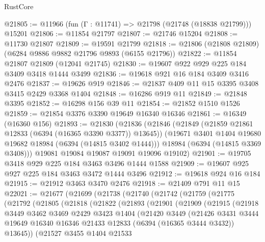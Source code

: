 \begin{lexlean}{RustCore}
\begin{coremodule}
@21805 := @11966 (fun (Γ : @11741) => @21798 (@21748 (@18838 @21799))) @15201
@21806 := @11854 @21797
@21807 := @21746 @15204
@21808 := @11730 @21807
@21809 := @19591 @21799
@21818 := @21806 (@21808 @21809) (@6284 @9886 @9882 @21796 @9893 (@6155 @21796))
@21822 := @11854 @21807 @21809 (@12041 @21745)
@21830 := @19607 @922 @929 @225 @184 @3409 @3418 @1444 @3499
@21836 := @19618 @921 @16 @184 @3409 @3416 @2476
@21837 := @19626 @919
@21846 := @21837 @409 @11 @15 @3395 @3408 @3415 @2429 @3368 @1404
@21848 := @16286 @919 @11
@21849 := @21848 @3395
@21852 := @16298 @156 @39 @11
@21854 := @21852 @1510 @1526
@21859 := @21854 @3376 @3390 @19649 @16340 @16346
@21861 := @16349 (@16360 @156)
@21893 := @21830
    (@21836
      (@21846
        (@21849 (@21859 @21861 @12833 (@6394 (@16365 @3390 @3377)) @13645))
        (@19671 @3401 @1404 @19680 @19682 @18984 (@6394 (@14815 @3402 @1444)))
        @18984
        (@6394 (@14815 @3369 @3408)))
      @19081
      @19084
      @19087
      @19091
      @19096
      @19102)
@21901 := @19705 @3418 @929 @225 @184 @3463 @3496 @1444 @1588
@21909 := @19607 @925 @927 @225 @184 @3463 @3472 @1444 @3496
@21912 := @19618 @924 @16 @184
@21915 := @21912 @3463 @3470 @2476
@21918 := @21409 @791 @11 @15
@22021 := @21677
    (@21699
      (@21738
        (@21740
          (@21742
            (@21759
              (@21775
                (@21792
                  (@21805
                    (@21818
                      (@21822
                        (@21893
                          (@21901
                            (@21909
                              (@21915
                                (@21918
                                  @3449
                                  @3462
                                  @3469
                                  @2429
                                  @3423
                                  @1404
                                  (@21420
                                    @3449
                                    (@21426
                                      @3431
                                      @3444
                                      @19649
                                      @16340
                                      @16346
                                      @21433
                                      @12833
                                      (@6394 (@16365 @3444 @3432))
                                      @13645))
                                  (@21527
                                    @3455
                                    @1404
                                    @21533

\end{coremodule}
\end{lexlean}
